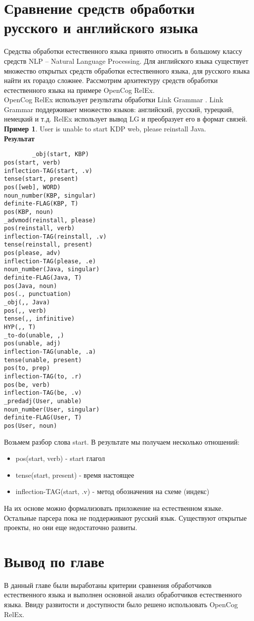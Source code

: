 \section{Сравнение средств обработки русского и английского языка} \label{sect2_3}
Средства обработки естественного языка принято относить в большому классу средств NLP – Natural Language Processing. Для английского языка существует множество открытых средств обработки естественного языка, для русского языка найти их гораздо сложнее. Рассмотрим архитектуру средств обработки естественного языка на примере OpenCog RelEx. \\
OpenCog RelEx использует результаты обработки Link Grammar \cite{linkgrammar}. Link Grammar поддерживает множество языков: английский, русский, турецкий, немецкий и т.д.  RelEx использует вывод LG и преобразует его в формат связей.
\textbf{Пример 1}. User is unable to start KDP web, please reinstall Java.\\
\textbf{Результат} 
\begin{verbatim}
		_obj(start, KBP)
pos(start, verb)
inflection-TAG(start, .v)
tense(start, present)
pos([web], WORD)
noun_number(KBP, singular)
definite-FLAG(KBP, T)
pos(KBP, noun)
_advmod(reinstall, please)
pos(reinstall, verb)
inflection-TAG(reinstall, .v)
tense(reinstall, present)
pos(please, adv)
inflection-TAG(please, .e)
noun_number(Java, singular)
definite-FLAG(Java, T)
pos(Java, noun)
pos(., punctuation)
_obj(,, Java)
pos(,, verb)
tense(,, infinitive)
HYP(,, T)
_to-do(unable, ,)
pos(unable, adj)
inflection-TAG(unable, .a)
tense(unable, present)
pos(to, prep)
inflection-TAG(to, .r)
pos(be, verb)
inflection-TAG(be, .v)
_predadj(User, unable)
noun_number(User, singular)
definite-FLAG(User, T)
pos(User, noun)

\end{verbatim}



Возьмем разбор слова start. В результате мы получаем несколько отношений:
\begin{itemize}
	\item pos(start, verb) - start глагол
	\item tense(start, present) - время настоящее
	\item inflection-TAG(start, .v) -  метод обозначения на схеме (индекс)
\end{itemize}

На их основе можно формализовать приложение на естественном языке. Остальные парсера пока не поддерживают русский язык. Существуют открытые проекты, но они еще недостаточно развиты.
\section{Вывод по главе} \label{sect2_4}
В данный главе были выработаны критерии сравнения обработчиков естественного языка и выполнен основной анализ обработчиков естественного языка. Ввиду развитости и доступности было решено использовать OpenCog RelEx.
\clearpage
